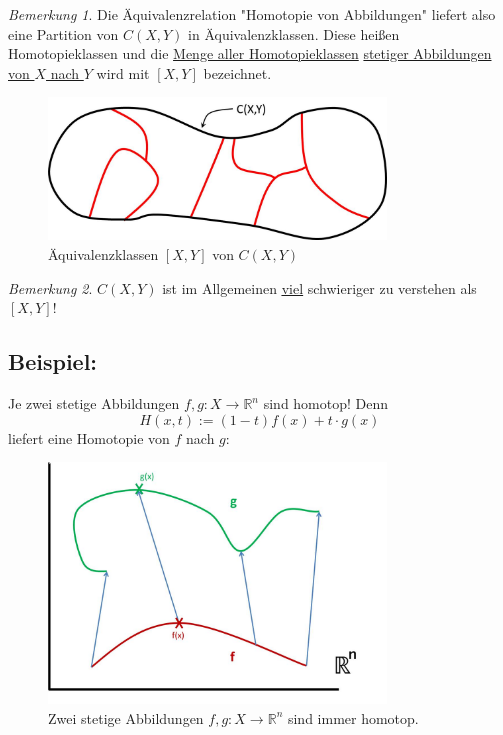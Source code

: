 \documentclass[a4paper,11pt,notitlepage]{report}
\theoremstyle{remark}
\newtheorem{remark}{Bemerkung}[chapter]
\theoremstyle{definition}
\newcommand{\R}{{\ensuremath{\mathbb{R}}}}
\newenvironment{bsp}[1]
{
\setlength{\fboxsep}{10pt}
\subsection*{Beispiel: #1}
\begin{upshape}
}
{
\end{upshape}
}
\begin{document}
\begin{remark}
Die Äquivalenzrelation "Homotopie von Abbildungen" liefert also eine Partition von $C(X,Y)$ in Äquivalenzklassen. Diese heißen Homotopieklassen und die \underline{Menge aller Homotopieklassen} \underline{stetiger Abbildungen} \underline{von $X$ nach $Y$} wird mit $[X,Y]$ bezeichnet.
\begin{figure}[h]
\centering
\includegraphics[width=0.8\textwidth]{images/Aequivalenzklassen.jpg}
\caption{Äquivalenzklassen $[X,Y]$ von $C(X,Y)$}
\end{figure}
\end{remark}

\begin{remark}
$C(X,Y)$ ist im Allgemeinen \underline{\underline{viel}} schwieriger zu verstehen als $[X,Y]$!
\end{remark}

\begin{bsp}{}
Je zwei stetige Abbildungen $f,g \colon X \rightarrow \R^n$ sind homotop! Denn 
$$H(x,t):= (1-t) f(x) + t \cdot g(x)$$ liefert eine Homotopie von $f$ nach $g$:
\begin{figure}[h]
\centering
\includegraphics[width=0.8\textwidth]{images/R_n_immer_homotop.jpg}
\caption{Zwei stetige Abbildungen $f,g \colon X \rightarrow \R^n$ sind immer homotop.}
\end{figure} 
\end{bsp}
\end{document}

